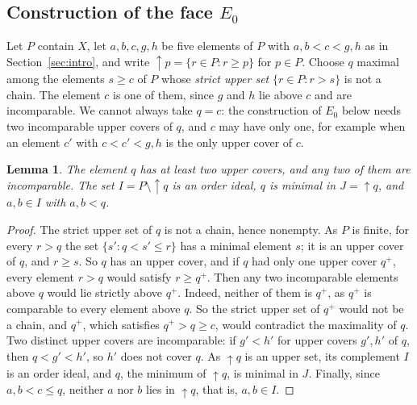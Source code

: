 \documentclass[11pt]{article}
\newtheorem{lemma}[theorem]{Lemma}
\theoremstyle{definition}
\theoremstyle{remark}
\begin{document}
\subsection{Construction of the face \texorpdfstring{$E_0$}{E0}}\label{subsec:E0}
Let $P$ contain $X$, let $a,b,c,g,h$ be five elements of $P$ with $a,b<c<g,h$ as in Section~\ref{sec:intro}, and write ${\uparrow}p=\{r\in P:r\geq p\}$ for
$p\in P$. Choose $q$ maximal among the elements $s\geq c$ of $P$ whose \emph{strict upper set} $\{r\in P:r>s\}$ is not a chain. The element $c$ is one of them, since $g$ and $h$ lie above $c$ and are incomparable. We cannot always take $q=c$: the construction of $E_0$ below needs
two incomparable upper covers of $q$, and $c$ may have only one, for example when an element $c'$ with $c<c'<g,h$ is the only upper cover of $c$.

\begin{lemma}\label{lem:q}
The element $q$ has at least two upper covers, and any two of them are
incomparable. The set $I=P\setminus{\uparrow}q$
is an order ideal, $q$ is minimal in $J={\uparrow}q$, and $a,b\in I$
with $a,b<q$.
\end{lemma}
\begin{proof}
The strict upper set of $q$ is not a chain, hence nonempty. As $P$ is finite, for every $r>q$ the set $\{s':q<s'\leq r\}$ has a minimal element $s$; it is an upper cover of $q$, and $r\geq s$. So $q$ has an upper
cover, and if $q$ had only
one upper cover $q^+$, every element $r>q$ would satisfy
$r\geq q^+$. Then any two incomparable elements above $q$ would lie strictly above $q^+$. Indeed, neither of them is $q^+$, as $q^+$ is comparable to every element above $q$. So the strict upper set of $q^+$ would not be a chain, and $q^+$, which satisfies $q^+>q\geq c$, would contradict the maximality of $q$. Two distinct upper covers are
incomparable: if $g'<h'$ for upper covers $g',h'$ of $q$, then $q<g'<h'$, so $h'$
does not cover $q$. As ${\uparrow}q$ is an upper set, its complement $I$ is an order ideal, and $q$, the minimum of ${\uparrow}q$, is minimal in $J$. Finally, since $a,b<c\leq q$, neither $a$ nor $b$ lies in ${\uparrow}q$, that is, $a,b\in I$.
\end{proof}
\end{document}
